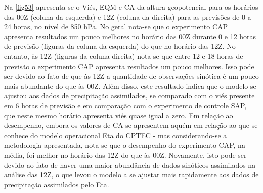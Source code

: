 Na \autoref{fig53} apresenta-se o Viés, EQM e CA da altura geopotencial para os horários das 00Z (coluna da esquerda) e 12Z (coluna da direita) para as previsões de 0 a 24 horas, no nível de 850 hPa. No geral nota-se que o experimento CAP apresenta resultados um pouco melhores no horário das 00Z durante 0 e 12 horas de previsão (figuras da coluna da esquerda) do que no horário das 12Z. No entanto, às 12Z (figuras da coluna direita) nota-se que entre 12 e 18 horas de previsão o experimento CAP apresenta resultados um pouco melhores. Isso pode ser devido ao fato de que às 12Z a quantidade de observações sinótica é um pouco mais abundante do que às 00Z. Além disso, este resultado indica que o modelo se ajustou aos dados de precipitação assimilados, se comparado com o viés presente em 6 horas de previsão e em comparação com o experimento de controle SAP, que neste mesmo horário apresenta viés quase igual a zero. Em relação ao desempenho, embora os valores de CA se apresentem aquém em relação ao que se conhece do modelo operacional Eta do CPTEC - mas considerando-se a metodologia apresentada, nota-se que o desempenho do experimento CAP, na média, foi melhor no horário das 12Z do que às 00Z. Novamente, isto pode ser devido ao fato de haver uma maior abundância de dados sinóticos assimilados na análise das 12Z, o que levou o modelo a se ajustar mais rapidamente aos dados de precipitação assimilados pelo Eta.

